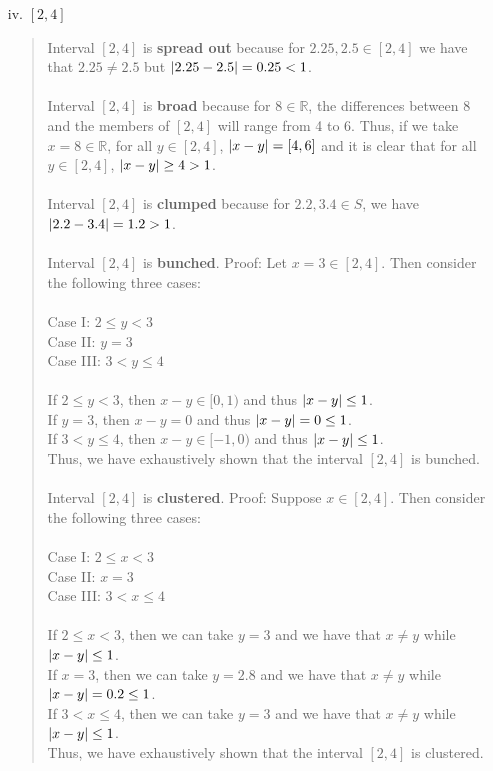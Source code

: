 \documentclass[12pt, a4paper]{article}                      %
\newcommand\und[1]{\underline{\smash{#1}}}
\DeclarePairedDelimiter\abs{\lvert}{\rvert}
\begin{document}
\begin{itemize}
\begin{itemize}
\begin{itemize}
\item[iv.]
$[2, 4]$
\begin{quote}
Interval $[2, 4]$ is \und{NOT} \textbf{spread out} because for $2.25, 2.5 \in [2, 4]$ we have that $2.25 \neq 2.5$ but $\abs{2.25 - 2.5} = 0.25 < 1$.
\\\\
Interval $[2, 4]$ is \und{NOT} \textbf{broad} because for $8 \in \mathbb{R}$, the differences between 8 and the members of $[2, 4]$ will range from 4 to 6.
Thus, if we take $x = 8 \in \mathbb{R}$, for all $y \in [2, 4]$, $\abs{x - y} = [4, 6]$ and it is clear that for all $y \in [2, 4]$, $\abs{x - y} \geq 4 > 1$.
\\\\
Interval $[2, 4]$ is \und{NOT} \textbf{clumped} because for $2.2, 3.4 \in S$, we have $\abs{2.2 - 3.4} = 1.2 > 1$.
\\\\
Interval $[2, 4]$ is \textbf{bunched}. Proof: Let $x = 3 \in [2, 4]$. Then consider the following three cases:\\\\
Case I: $2 \leq y < 3$\\
Case II: $y = 3$\\
Case III: $3 < y \leq 4$\\\\
If $2 \leq y < 3$, then $x - y \in [0, 1)$ and thus $\abs{x - y} \leq 1$.\\
If $y = 3$, then $x - y = 0$ and thus $\abs{x - y} = 0 \leq 1$.\\
If $3 < y \leq 4$, then $x - y \in [-1, 0)$ and thus $\abs{x - y} \leq 1$.\\
Thus, we have exhaustively shown that the interval $[2, 4]$ is bunched.
\\\\
Interval $[2, 4]$ is \textbf{clustered}. Proof: Suppose $x \in [2, 4]$. Then consider the following three cases:\\\\
Case I: $2 \leq x < 3$\\
Case II: $x = 3$\\
Case III: $3 < x \leq 4$\\\\
If $2 \leq x < 3$, then we can take $y = 3$ and we have that $x \neq y$ while $\abs{x - y} \leq 1$.\\
If $x = 3$, then we can take $y = 2.8$ and we have that $x \neq y$ while $\abs{x - y} = 0.2 \leq 1$.\\
If $3 < x \leq 4$, then we can take $y = 3$ and we have that $x \neq y$ while $\abs{x - y} \leq 1$.\\
Thus, we have exhaustively shown that the interval $[2, 4]$ is clustered.
\end{quote}


\end{itemize}
\end{itemize}
\end{itemize}
\end{document}
